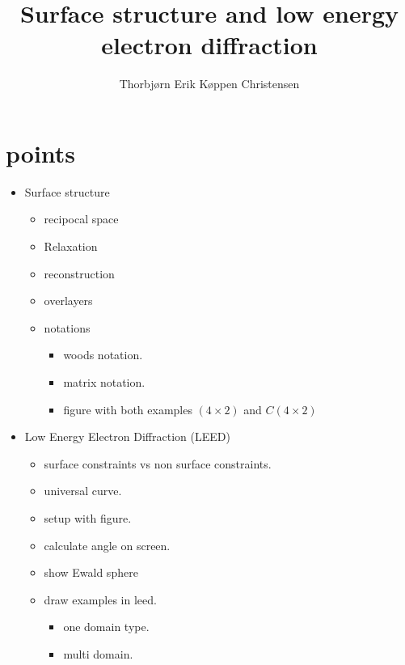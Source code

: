 \documentclass[article,a4paper,openleft]{memoir}
\title{Surface structure and low energy electron diffraction}
\author{Thorbjørn Erik Køppen Christensen}
\begin{document}
\maketitle
\section{points}
\begin{itemize}
        \item Surface structure
        \begin{itemize}
                \item recipocal space
                \item Relaxation
                \item reconstruction
                \item overlayers
                \item notations
                        \begin{itemize}
                                \item woods notation.
                                \item matrix notation.
                                \item figure with both examples $(4\times2)$ and $C(4\times2)$
                        \end{itemize}
        \end{itemize}
        \item Low Energy Electron Diffraction (LEED)
                \begin{itemize}
                        \item surface constraints vs non surface constraints.
                        \item universal curve.
                        \item setup with figure.
                        \item calculate angle on screen.
                        \item show Ewald sphere
                        \item draw examples in leed.
                                \begin{itemize}
                                        \item one domain type.
                                        \item multi domain.
                                \end{itemize}
                \end{itemize}
\end{itemize}
\end{document}
